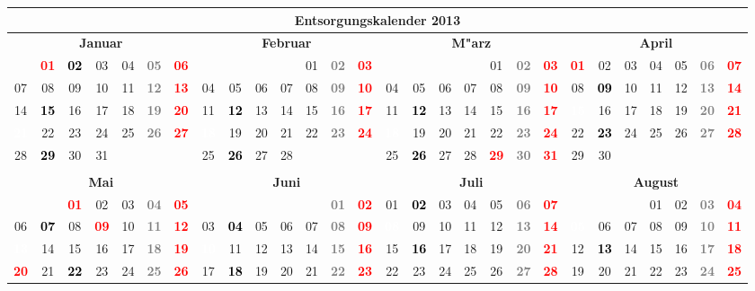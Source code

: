 \documentclass[10pt,a4paper,landscape]{article}
\newcommand{\bb}[1]{\cellcolor{MidnightBlue}\textcolor{white}{\bf #1}}
\newcommand{\yb}[1]{\cellcolor{yellow}\textcolor{black}{\bf #1}}
\newcommand{\rb}[1]{\textbf{\textcolor{red}{#1}}}
\newcommand{\hv}[1]{\textbf{\textcolor{Gray}{#1}}}
\begin{document}
\begin{tabular}{|ccccccc|ccccccc|ccccccc|ccccccc|}
\hline
\multicolumn{28}{|c|}{\textbf{Entsorgungskalender 2013}} \\\hline
\multicolumn{7}{|c|}{\bf Januar} & \multicolumn{7}{|c|}{\bf Februar} & \multicolumn{7}{|c|}{\bf M"arz} & \multicolumn{7}{|c|}{\bf April} \\
& \rb{01} & \yb{02} & 03 & 04 & \hv{05} & \rb{06} & & & & & 01 & \hv{02} & \rb{03} & & & & & 01 & \hv{02} & \rb{03} & \rb{01} & 02 & 03 & 04 & 05 & \hv{06} & \rb{07} \\
07 & 08 & 09 & 10 & 11 & \hv{12} & \rb{13} & 04 & 05 & 06 & 07 & 08 & \hv{09} & \rb{10} & 04 & 05 & 06 & 07 & 08 & \hv{09} & \rb{10} & 08 & \yb{09} & 10 & 11 & 12 & \hv{13} & \rb{14} \\
14 & \yb{15} & 16 & 17 & 18 & \hv{19} & \rb{20} & 11 & \yb{12} & 13 & 14 & 15 & \hv{16} & \rb{17} & 11 & \yb{12} & 13 & 14 & 15 & \hv{16} & \rb{17} & \bb{15} & 16 & 17 & 18 & 19 & \hv{20} & \rb{21} \\
\bb{21} & 22 & 23 & 24 & 25 & \hv{26} & \rb{27} & \bb{18} & 19 & 20 & 21 & 22 & \hv{23} & \rb{24} & \bb{18} & 19 & 20 & 21 & 22 & \hv{23} & \rb{24} & 22 & \yb{23} & 24 & 25 & 26 & \hv{27} & \rb{28} \\
28 & \yb{29} & 30 & 31 & & & & 25 & \yb{26} & 27 & 28 & & & & 25 & \yb{26} & 27 & 28 & \rb{29} & \hv{30} & \rb{31} & 29 & 30 &  &  &  &  &  \\
& & & & & & & & & & & & & & & & & & & & &  &  &  &  &  &  &  \\
\hline
\multicolumn{7}{|c|}{\bf Mai} & \multicolumn{7}{|c|}{\bf Juni} & \multicolumn{7}{|c|}{\bf Juli} & \multicolumn{7}{|c|}{\bf August} \\
& & \rb{01} & 02 & 03 & \hv{04} & \rb{05} & & & & & & \hv{01} & \rb{02} & 01 & \yb{02} & 03 & 04 & 05 & \hv{06} & \rb{07} & & & & 01 & 02 & \hv{03} & \rb{04} \\
06 & \yb{07} & 08 & \rb{09} & 10 & \hv{11} & \rb{12} & 03 & \yb{04} & 05 & 06 & 07 & \hv{08} & \rb{09} & \bb{08} & 09 & 10 & 11 & 12 & \hv{13} & \rb{14} & \bb{05} & 06 & 07 & 08 & 09 & \hv{10} & \rb{11} \\
\bb{13} & 14 & 15 & 16 & 17 & \hv{18} & \rb{19} & \bb{10} & 11 & 12 & 13 & 14 & \hv{15} & \rb{16} & 15 & \yb{16} & 17 & 18 & 19 & \hv{20} & \rb{21} & 12 & \yb{13} & 14 & 15 & 16 & \hv{17} & \rb{18} \\
\rb{20} & 21 & \yb{22} & 23 & 24 & \hv{25} & \rb{26} & 17 & \yb{18} & 19 & 20 & 21 & \hv{22} & \rb{23} & 22 & 23 & 24 & 25 & 26 & \hv{27} & \rb{28} & 19 & 20 & 21 & 22 & 23 & \hv{24} & \rb{25} \\

\end{tabular}
\end{document}

